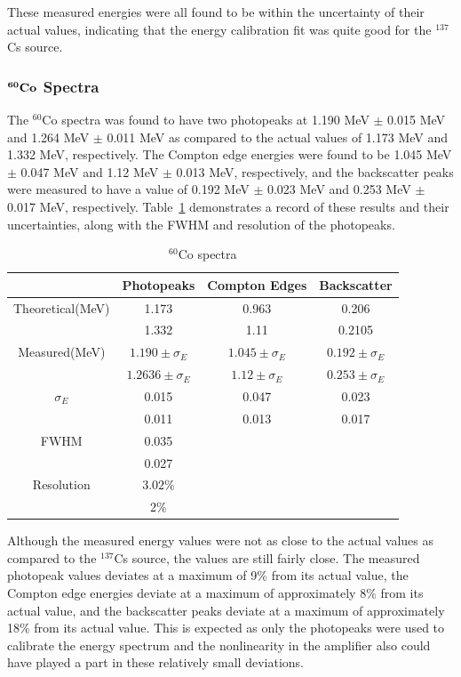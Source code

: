 \documentclass[%
 aip,
rsi,%
 amsmath,amssymb,
 reprint,%
author-numerical,%
]{revtex4-1}
\begin{document}
These measured energies were all found to be within the uncertainty of their actual values, indicating that the energy calibration fit was quite good for the $^ { 137 }$Cs source.

\subsubsection{$\bf{ ^ { 60 }Co }$ Spectra }
The $^ {60}$Co  spectra was found to have two photopeaks at 1.190 MeV $\pm$ 0.015 MeV and 1.264 MeV $\pm$ 0.011 MeV as compared to the actual values of 1.173 MeV and 1.332 MeV, respectively. The Compton edge energies were found to be 1.045 MeV $\pm$ 0.047 MeV and 1.12 MeV $\pm$ 0.013 MeV, respectively, and the backscatter peaks were measured to have a value of 0.192 MeV $\pm$ 0.023 MeV and 0.253 MeV $\pm$ 0.017 MeV, respectively. Table~\ref{tab:table2} demonstrates a record of these results and their uncertainties, along with the FWHM and resolution of the photopeaks.


\begin{table}[H]
\caption{\label{tab:table2}$\mathrm { ^ { 60 }Co}$ spectra }
\begin{ruledtabular}
\begin{tabular}{cccc}
&Photopeaks&Compton Edges&Backscatter\\
\hline
Theoretical(MeV)&1.173&0.963 &0.206\\
&1.332&1.11 &0.2105\\
\hline
Measured(MeV)&$1.190\pm\sigma_E$&$1.045\pm\sigma_E$&$0.192\pm\sigma_E$\\
&$1.2636\pm\sigma_E$&$1.12\pm\sigma_E$&$0.253\pm\sigma_E$\\
\hline
$\sigma_E$ &0.015& 0.047&0.023 \\
 &0.011&  0.013 & 0.017\\
 \hline
FWHM &0.035& & \\
&0.027&  & \\
\hline
Resolution &$3.02\%$ &  & \\
 &$2\%$ &  & \\
\end{tabular}
\end{ruledtabular}
\end{table}

Although the measured energy values were not as close to the actual values as compared to the $^ { 137 }$Cs source, the values are still fairly close. The measured photopeak values deviates at a maximum of 9$\%$ from its actual value, the Compton edge energies deviate at a maximum of approximately 8$\%$ from its actual value, and the backscatter peaks deviate at a maximum of approximately 18$\%$ from its actual value. This is expected as only the photopeaks were used to calibrate the energy spectrum and the nonlinearity in the amplifier also could have played a part in these relatively small deviations.
\end{document}
